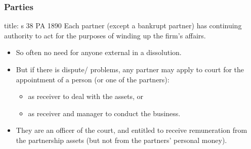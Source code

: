 \documentclass[
]{article}
\newenvironment{Shaded}{}{}
\newcommand{\NormalTok}[1]{#1}
\providecommand{\tightlist}{%
  \setlength{\itemsep}{0pt}\setlength{\parskip}{0pt}}
\begin{document}
\hypertarget{parties}{%
\subsubsection{Parties}\label{parties}}

\begin{Shaded}
\begin{Highlighting}[]
\NormalTok{title: s 38 PA 1890}
\NormalTok{Each partner (except a bankrupt partner) has continuing authority to act for the purposes of winding up the firm’s affairs.}
\end{Highlighting}
\end{Shaded}

\begin{itemize}
\tightlist
\item
  So often no need for anyone external in a dissolution.
\item
  But if there is dispute/ problems, any partner may apply to court for
  the appointment of a person (or one of the partners):

  \begin{itemize}
  \tightlist
  \item
    as receiver to deal with the assets, or
  \item
    as receiver and manager to conduct the business.
  \end{itemize}
\item
  They are an officer of the court, and entitled to receive remuneration
  from the partnership assets (but not from the partners' personal
  money).
\end{itemize}
\end{document}
